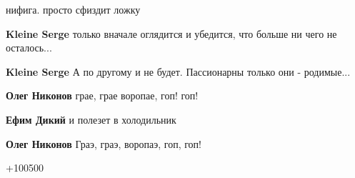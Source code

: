 \begin{itemize}
\begin{itemize}
нифига. просто сфиздит ложку

 
\textbf{Kleine Serge} только вначале оглядится и убедится, что больше ни чего не осталось...

 
\textbf{Kleine Serge} А по другому и не будет. Пассионарны только они - родимые...

 
\textbf{Олег Никонов} грае, грае воропае, гоп! гоп!

 
\textbf{Ефим Дикий} и полезет в холодильник

 
\textbf{Олег Никонов} Граэ, граэ, воропаэ, гоп, гоп!
\end{itemize}

 
+100500

 

\end{itemize}
